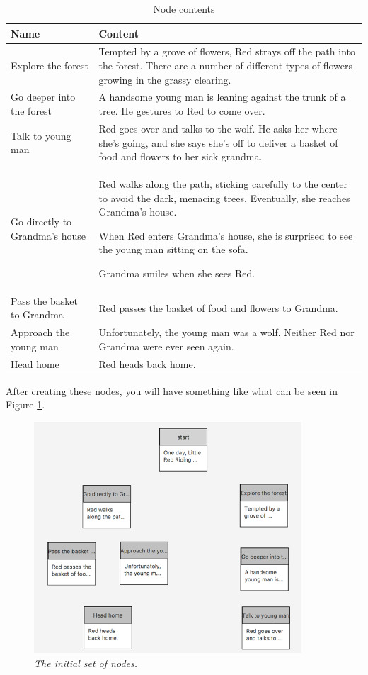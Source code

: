 \documentclass{article}
\begin{document}
\begin{table}[h]
  \centering
  \begin{tabular}{| p{3cm} | p{8cm} |}
    \hline
    Name & Content \\
    \hline
    \hline
    Explore the forest & 
    Tempted by a grove of flowers, Red strays off the path into the forest.
    There are a number of different types of flowers growing in the grassy
    clearing. \\
    \hline
    Go deeper into the forest &
    A handsome young man is leaning against the trunk of a tree. He gestures to
    Red to come over. \\
    \hline
    Talk to young man &
    Red goes over and talks to the wolf. He asks her where she's going, and she
    says she's off to deliver a basket of food and flowers to her sick grandma.
    \\
    \hline
    Go directly to Grandma's house &
    Red walks along the path, sticking carefully to the center to avoid the
    dark, menacing trees. Eventually, she reaches Grandma's house. 
  
    \bigskip
  
    When Red enters Grandma's house, she is surprised to see the young man
    sitting on the sofa.
  
    \bigskip
  
    Grandma smiles when she sees Red. \\
    \hline
    Pass the basket to Grandma &
    Red passes the basket of food and flowers to Grandma. \\
    \hline
    Approach the young man &
    Unfortunately, the young man was a wolf. Neither Red nor Grandma were ever
    seen again. \\
    \hline
    Head home &
    Red heads back home. \\
    \hline
  \end{tabular}
  \caption{Node contents}
  \label{table:tut3:node_content}
\end{table}

After creating these nodes, you will have something like what can be seen in Figure \ref{fig:tut3:initial_nodes}.

\begin{figure}[h]
  \centering \includegraphics[width=10cm]{images/hypedyn-tutorial-3-figure-2}
  \caption{\textit{The initial set of nodes.}}
  \label{fig:tut3:initial_nodes}
\end{figure} 
\end{document}
